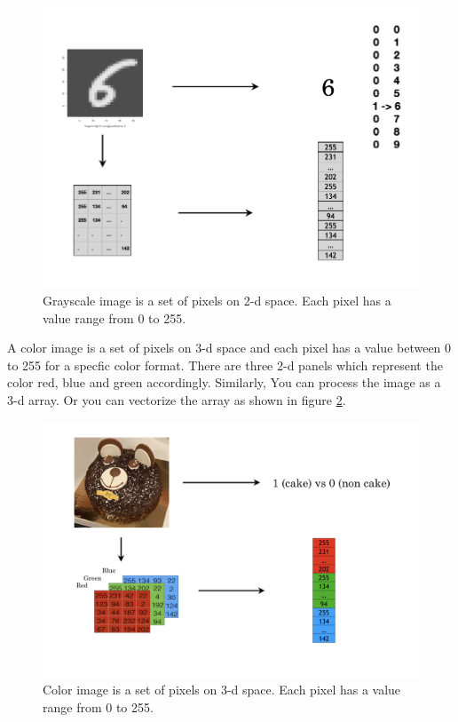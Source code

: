 \documentclass[
  12pt,
]{krantz}
\begin{document}
\begin{figure}

{\centering \includegraphics[width=0.8\linewidth]{images/grayscaleimage} 

}

\caption{Grayscale image is a set of pixels on 2-d space. Each pixel has a value range from 0 to 255.}\label{fig:grayscaleimage}
\end{figure}

A color image is a set of pixels on 3-d space and each pixel has a value between 0 to 255 for a specfic color format. There are three 2-d panels which represent the color red, blue and green accordingly. Similarly, You can process the image as a 3-d array. Or you can vectorize the array as shown in figure \ref{fig:colorimage}.

\begin{figure}

{\centering \includegraphics[width=0.8\linewidth]{images/colorimage} 

}

\caption{Color image is a set of pixels on 3-d space. Each pixel has a value range from 0 to 255.}\label{fig:colorimage}
\end{figure}
\end{document}
